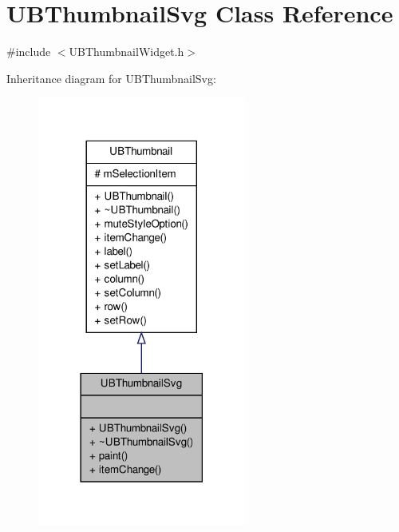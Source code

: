 \hypertarget{class_u_b_thumbnail_svg}{\section{U\-B\-Thumbnail\-Svg Class Reference}
\label{df/d68/class_u_b_thumbnail_svg}
}


{\ttfamily \#include $<$U\-B\-Thumbnail\-Widget.\-h$>$}



Inheritance diagram for U\-B\-Thumbnail\-Svg\-:
\nopagebreak
\begin{figure}[H]
\begin{center}
\leavevmode
\includegraphics[width=194pt]{d9/df9/class_u_b_thumbnail_svg__inherit__graph}
\end{center}
\end{figure}


